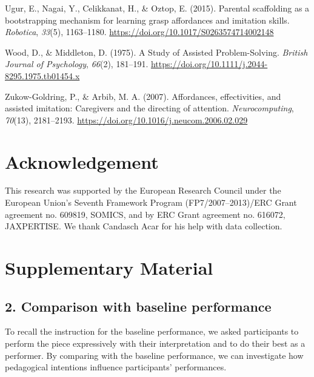 \documentclass[
  man,floatsintext]{apa6}
\newlength{\cslhangindent}
\newlength{\cslentryspacingunit} %
\newenvironment{CSLReferences}[2] %
 {%
  \setlength{\parindent}{0pt}
  \ifodd #1
  \let\oldpar\par
  \def\par{\hangindent=\cslhangindent\oldpar}
  \fi
  \setlength{\parskip}{#2\cslentryspacingunit}
 }%
 {}
\begin{document}
\begin{CSLReferences}{1}{0}
\leavevmode{}%
Ugur, E., Nagai, Y., Celikkanat, H., \& Oztop, E. (2015). Parental scaffolding as a bootstrapping mechanism for learning grasp affordances and imitation skills. \emph{Robotica}, \emph{33}(5), 1163--1180. \url{https://doi.org/10.1017/S0263574714002148}

\leavevmode{}%
Wood, D., \& Middleton, D. (1975). A {Study} of {Assisted Problem-Solving}. \emph{British Journal of Psychology}, \emph{66}(2), 181--191. \url{https://doi.org/10.1111/j.2044-8295.1975.tb01454.x}

\leavevmode{}%
Zukow-Goldring, P., \& Arbib, M. A. (2007). Affordances, effectivities, and assisted imitation: {Caregivers} and the directing of attention. \emph{Neurocomputing}, \emph{70}(13), 2181--2193. \url{https://doi.org/10.1016/j.neucom.2006.02.029}

\end{CSLReferences}

\endgroup

\hypertarget{acknowledgement}{%
\section{Acknowledgement}\label{acknowledgement}}

This research was supported by the European Research Council under the European Union's Seventh Framework Program (FP7/2007--2013)/ERC Grant agreement no. 609819, SOMICS, and by ERC Grant agreement no. 616072, JAXPERTISE. We thank Candasch Acar for his help with data collection.

\clearpage

\hypertarget{supplementary-material}{%
\section{Supplementary Material}\label{supplementary-material}}

\hypertarget{comparison-with-baseline-performance}{%
\subsection{2. Comparison with baseline performance}\label{comparison-with-baseline-performance}}

To recall the instruction for the baseline performance, we asked participants to perform the piece expressively with their interpretation and to do their best as a performer. By comparing with the baseline performance, we can investigate how pedagogical intentions influence participants' performances.
\end{document}
